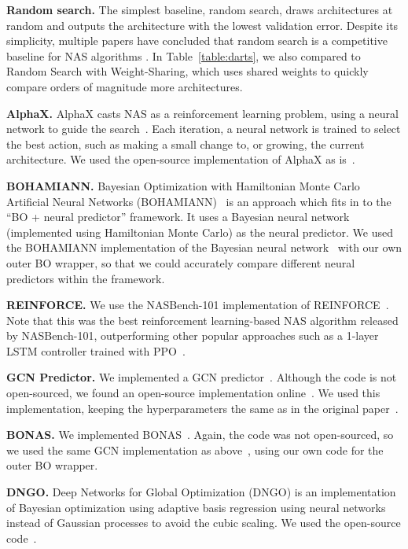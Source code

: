 \documentclass[11pt]{article}
\numberwithin{equation}{section}
\numberwithin{figure}{section}
\theoremstyle{plain}
\theoremstyle{definition}
\begin{document}
\textbf{Random search.} 
The simplest baseline, random search, draws  architectures at
random and outputs the architecture with the lowest validation error.
Despite its simplicity, multiple papers have concluded that random search
is a competitive baseline for NAS algorithms \cite{randomnas, sciuto2019evaluating}.
In Table~\ref{table:darts}, we also compared to Random Search with Weight-Sharing,
which uses shared weights to quickly compare orders of magnitude more architectures. 

\textbf{AlphaX.}
AlphaX casts NAS as a reinforcement learning problem, using a neural network to
guide the search~\cite{alphax}.
Each iteration, a neural network is trained to select the best action,
such as making a small change to, or growing, the current architecture.
We used the open-source implementation of AlphaX as is~\cite{alphax}.

\textbf{BOHAMIANN.}
Bayesian Optimization with Hamiltonian Monte Carlo Artificial Neural Networks 
(BOHAMIANN)~\cite{springenberg2016bayesian}
is an approach which fits in to the ``BO + neural predictor'' framework.
It uses a Bayesian neural network (implemented using Hamiltonian Monte Carlo) as the
neural predictor. We used the BOHAMIANN implementation of the Bayesian neural 
network~\cite{springenberg2016bayesian} with our own outer BO wrapper, so that
we could accurately compare different neural predictors within the framework.


\textbf{REINFORCE.} 
We use the NASBench-101 implementation of REINFORCE~\cite{reinforce}.
Note that this was the best reinforcement learning-based NAS algorithm released by
NASBench-101, outperforming other popular approaches such as a
1-layer LSTM controller trained with PPO~\cite{nasbench}.

\textbf{GCN Predictor.}
We implemented a GCN predictor~\cite{wen2019neural}. Although the code is not open-sourced,
we found an open-source implementation online~\cite{zhang2020neural}.
We used this implementation, keeping the hyperparameters the same as in the original
paper~\cite{wen2019neural}.

\textbf{BONAS.}
We implemented BONAS~\cite{shi2019multi}. Again, the code was not open-sourced,
so we used the same GCN implementation as above~\cite{zhang2020neural},
using our own code for the outer BO wrapper.

\textbf{DNGO.}
Deep Networks for Global Optimization (DNGO) is an implementation of Bayesian optimization
using adaptive basis regression using neural networks instead of
Gaussian processes to avoid the cubic scaling.
We used the open-source code~\cite{snoek2015scalable}.
\end{document}
